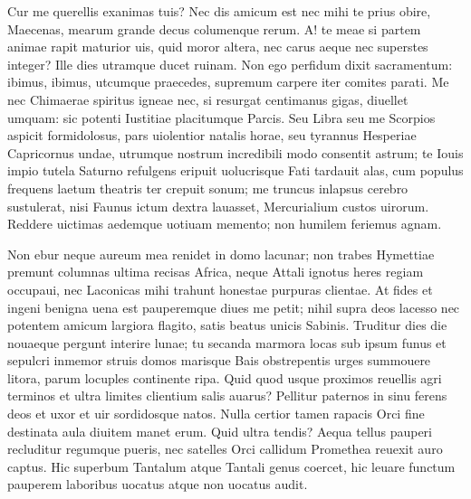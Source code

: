 \documentclass{book}
\newenvironment {carmen} [1] [\relax] 
  {\Titulus \Versus \incipit*\numerus{1}#1}
  {\endVersus}
\newcommand {\Alcaic}    {\Forma \strophae {0 \poena 01 \poena 2}}
\newcommand {\Hippon}    {\Forma \strophae {2 \poena 0}}
\begin{document}
\begin{carmen}[\Alcaic]


Cur me querellis exanimas tuis?
 Nec dis amicum est nec mihi te prius
      obire, Maecenas, mearum
      grande decus columenque rerum. 
A! te meae si partem animae rapit                
maturior uis, quid moror altera,
      nec carus aeque nec superstes
      integer? Ille dies utramque 
ducet ruinam. Non ego perfidum
 dixit sacramentum: ibimus, ibimus,               
      utcumque praecedes, supremum
      carpere iter comites parati. 
Me nec Chimaerae spiritus igneae
 nec, si resurgat centimanus gigas,
      diuellet umquam: sic potenti               
      Iustitiae placitumque Parcis. 
Seu Libra seu me Scorpios aspicit
 formidolosus, pars uiolentior
      natalis horae, seu tyrannus
      Hesperiae Capricornus undae,                
utrumque nostrum incredibili modo
 consentit astrum; te Iouis impio
      tutela Saturno refulgens
      eripuit uolucrisque Fati 
tardauit alas, cum populus frequens               
 laetum theatris ter crepuit sonum;
      me truncus inlapsus cerebro
      sustulerat, nisi Faunus ictum 
dextra lauasset, Mercurialium
 custos uirorum. Reddere uictimas               
      aedemque uotiuam memento;
      non humilem feriemus agnam. 

\end{carmen}

\begin{carmen}[\Hippon]

     Non ebur neque aureum
 mea renidet in domo lacunar;
      non trabes Hymettiae
 premunt columnas ultima recisas
      Africa, neque Attali               
 ignotus heres regiam occupaui,
      nec Laconicas mihi
 trahunt honestae purpuras clientae.
      At fides et ingeni
 benigna uena est pauperemque diues               
      me petit; nihil supra
 deos lacesso nec potentem amicum
      largiora flagito,
 satis beatus unicis Sabinis.
      Truditur dies die               
 nouaeque pergunt interire lunae;
      tu secanda marmora
 locas sub ipsum funus et sepulcri
      inmemor struis domos
 marisque Bais obstrepentis urges               
      summouere litora,
 parum locuples continente ripa.
      Quid quod usque proximos
 reuellis agri terminos et ultra
      limites clientium               
 salis auarus? Pellitur paternos
      in sinu ferens deos
 et uxor et uir sordidosque natos.
      Nulla certior tamen
 rapacis Orci fine destinata               
      aula diuitem manet
 erum. Quid ultra tendis? Aequa tellus
      pauperi recluditur
 regumque pueris, nec satelles Orci
      callidum Promethea               
 reuexit auro captus. Hic superbum
      Tantalum atque Tantali
 genus coercet, hic leuare functum
      pauperem laboribus
 uocatus atque non uocatus audit.                

\end{carmen}
\end{document}
